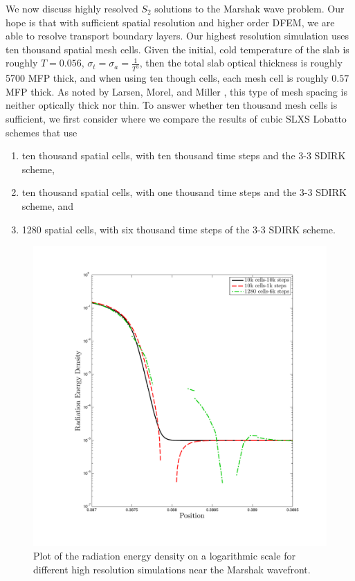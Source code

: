 We now discuss highly resolved $S_2$ solutions to the Marshak wave problem.
Our hope is that with sufficient spatial resolution and higher order DFEM, we are able to resolve transport boundary layers.
Our highest resolution simulation uses ten thousand spatial mesh cells.
Given the initial, cold temperature of the slab is roughly $T=0.056$,  $\sigma_t = \sigma_a = \frac{1}{T^3}$, then the total slab optical thickness is roughly 5700 MFP thick, and when using ten though cells, each mesh cell is roughly $0.57$ MFP thick.  
As noted by Larsen, Morel, and Miller \cite{thick_diffusion_larsen}, this type of mesh spacing is neither optically thick nor thin.
To answer whether ten thousand mesh cells is sufficient, we first consider  where we compare the results of cubic SLXS Lobatto schemes that use
\begin{enumerate}
\item ten thousand spatial cells, with ten thousand time steps and the 3-3 SDIRK scheme,
\item ten thousand spatial cells, with one thousand time steps and the 3-3 SDIRK scheme, and 
\item 1280 spatial cells, with six thousand time steps of the 3-3 SDIRK scheme.
\end{enumerate} 
\begin{figure}[!htp]
\centering
\includegraphics[width=13cm,trim=1.0in  0.75in 1.0in 1.0in,clip=true]{chapter6_grey_radtran/Dissertation_Data/Zoom_10k_Phi.pdf}
\caption{Plot of the radiation energy density on a logarithmic scale for different high resolution simulations near the Marshak wavefront.}
\label{fig:res_zoom_comparison}
\end{figure}
